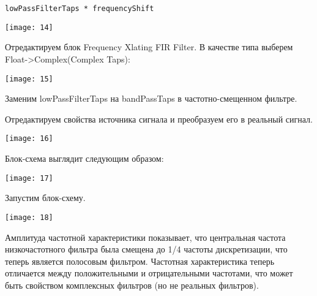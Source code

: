 \begin{verbatim}
lowPassFilterTaps * frequencyShift
\end{verbatim}

\begin{center}
    \texttt{[image: 14]}
\end{center}

Отредактируем блок Frequency Xlating FIR Filter. В качестве типа выберем Float->Complex(Complex Taps):

\begin{center}
    \texttt{[image: 15]}
\end{center}

Заменим lowPassFilterTaps на bandPassTaps в частотно-смещенном фильтре.

Отредактируем свойства источника сигнала и преобразуем его в реальный сигнал.

\begin{center}
    \texttt{[image: 16]}
\end{center}

Блок-схема выглядит следующим образом:

\begin{center}
    \texttt{[image: 17]}
\end{center}

Запустим блок-схему.

\begin{center}
    \texttt{[image: 18]}
\end{center}

Амплитуда частотной характеристики показывает, что центральная частота низкочастотного фильтра была смещена до 1/4 частоты дискретизации, что теперь является полосовым фильтром. Частотная характеристика теперь отличается между положительными и отрицательными частотами, что может быть свойством комплексных фильтров (но не реальных фильтров).